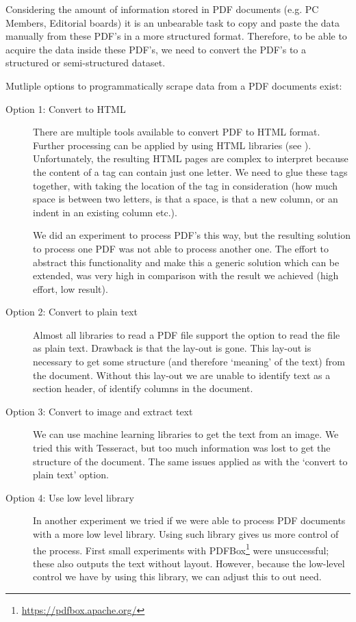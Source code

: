 \documentclass{ou-report}
\begin{document}
Considering the amount of information stored in PDF documents (e.g. PC Members, 
Editorial boards) it is an unbearable task to 
copy and paste the data manually from these PDF's in a more structured format.
Therefore, to be able to acquire the data inside these PDF's, we need to convert 
the PDF's to a structured or semi-structured dataset.

Mutliple options to programmatically scrape data from a PDF documents exist:
\begin{description}
    \item[Option 1: Convert to HTML] There are multiple tools available to 
        convert PDF
        to HTML format. Further processing can be applied by using HTML
        libraries (see ). Unfortunately, the resulting HTML pages are complex to
        interpret
        because the content of a  tag can contain just one letter. We need to 
        glue these 
        tags together, with taking the location of the tag in consideration
        (how much space is between two letters, is that a space, is that a 
        new column, or an indent in an existing column etc.). 
        
        We did an 
        experiment to process PDF's this way, but the resulting solution to 
        process one PDF was not able to process another one. The effort to 
        abstract this functionality and make this a generic solution which 
        can be extended, was very high 
        in comparison with the result we achieved (high effort, low result).

    \item[Option 2: Convert to plain text] Almost all libraries to read a PDF 
        file 
        support the option to read the file as plain text. Drawback is that
        the lay-out is gone. This lay-out is necessary to get some structure
        (and therefore `meaning' of the text) from the document. Without this
        lay-out we are unable to identify text as a section header, of identify
        columns in the document.
    
    \item[Option 3: Convert to image and extract text] We can use machine 
        learning libraries to get the text from an image. We tried this 
        with Tesseract, but too much information was lost to get the 
        structure of the document. The same issues applied as with the `convert
        to plain text' option.

    \item[Option 4: Use low level library] In another experiment we tried if 
        we were able to process PDF documents with a more low level library. 
        Using such library gives us more
        control of the process. First small experiments with
        PDFBox\footnote{\url{https://pdfbox.apache.org/}} were 
        unsuccessful; these also outputs the text without layout. However, 
        because the low-level control we have by using this library, we can 
        adjust this to out need.
\end{description}
\end{document}
